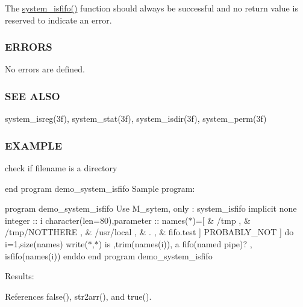 The \hyperlink{namespacem__system_acbcaa0c5075ca103815f441ee410e1a3}{system\+\_\+isfifo()} function should always be successful and no return value is reserved to indicate an error.

\subsubsection*{E\+R\+R\+O\+RS}

No errors are defined.

\subsubsection*{S\+EE A\+L\+SO}

system\+\_\+isreg(3f), system\+\_\+stat(3f), system\+\_\+isdir(3f), system\+\_\+perm(3f)

\subsubsection*{E\+X\+A\+M\+P\+LE}

check if filename is a directory

end program demo\+\_\+system\+\_\+isfifo Sample program\+:

program demo\+\_\+system\+\_\+isfifo Use M\+\_\+sytem, only \+: system\+\_\+isfifo implicit none integer \+:\+: i character(len=80),parameter \+:\+: names($\ast$)=\mbox{[} \& \textquotesingle{}/tmp \textquotesingle{}, \& \textquotesingle{}/tmp/\+N\+O\+T\+T\+H\+E\+RE \textquotesingle{}, \& \textquotesingle{}/usr/local \textquotesingle{}, \& \textquotesingle{}. \textquotesingle{}, \& \textquotesingle{}fifo.\+test \textquotesingle{}\mbox{]} \textquotesingle{}P\+R\+O\+B\+A\+B\+L\+Y\+\_\+\+N\+OT \textquotesingle{}\mbox{]} do i=1,size(names) write($\ast$,$\ast$)\textquotesingle{} is \textquotesingle{},trim(names(i)),\textquotesingle{} a fifo(named pipe)? \textquotesingle{}, isfifo(names(i)) enddo end program demo\+\_\+system\+\_\+isfifo

Results\+: 

References false(), str2arr(), and true().

